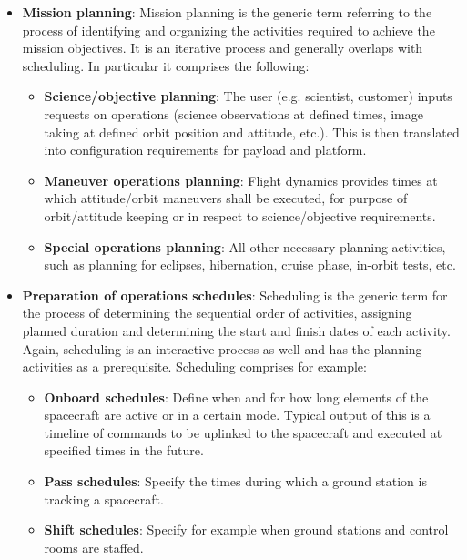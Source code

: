 \begin{itemize}
\item \textbf{Mission planning}: Mission planning is the generic term referring to the process of identifying and organizing the activities required to achieve the mission objectives. It is an iterative process and generally overlaps with scheduling. In particular it comprises the following:

	\begin{itemize}
	\item \textbf{Science/objective planning}: The user (e.g. scientist, customer) inputs requests on operations (science observations at defined times, image taking at defined orbit position and attitude, etc.). This is then translated into configuration requirements for payload and platform.

	\item \textbf{Maneuver operations planning}: Flight dynamics provides times at which attitude/orbit maneuvers shall be executed, for purpose of orbit/attitude keeping or in respect to science/objective requirements.

	\item \textbf{Special operations planning}: All other necessary planning activities, such as planning for eclipses, hibernation, cruise phase, in-orbit tests, etc.
	\end{itemize}

\item \textbf{Preparation of operations schedules}: Scheduling is the generic term for the process of determining the sequential order of activities, assigning planned duration and determining the start and finish dates of each activity. Again, scheduling is an interactive process as well and has the planning activities as a prerequisite. Scheduling comprises for example:

	\begin{itemize}
	\item \textbf{Onboard schedules}: Define when and for how long elements of the spacecraft are active or in a certain mode. Typical output of this is a timeline of commands to be uplinked to the spacecraft and executed at specified times in the future. 
	\item \textbf{Pass schedules}: Specify the times during which a ground station is tracking a spacecraft. 
	\item \textbf{Shift schedules}: Specify for example when ground stations and control rooms are staffed.
	\end{itemize}
	

\end{itemize}
